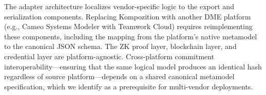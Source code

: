 The adapter architecture localizes vendor-specific logic to the export and serialization components.
Replacing Kompozition with another DME platform (e.g., Cameo Systems Modeler with Teamwork Cloud) requires reimplementing these components, including the mapping from the platform's native metamodel to the canonical JSON schema.
The ZK proof layer, blockchain layer, and credential layer are platform-agnostic.
Cross-platform commitment interoperability---ensuring that the same logical model produces an identical hash regardless of source platform---depends on a shared canonical metamodel specification, which we identify as a prerequisite for multi-vendor deployments.
